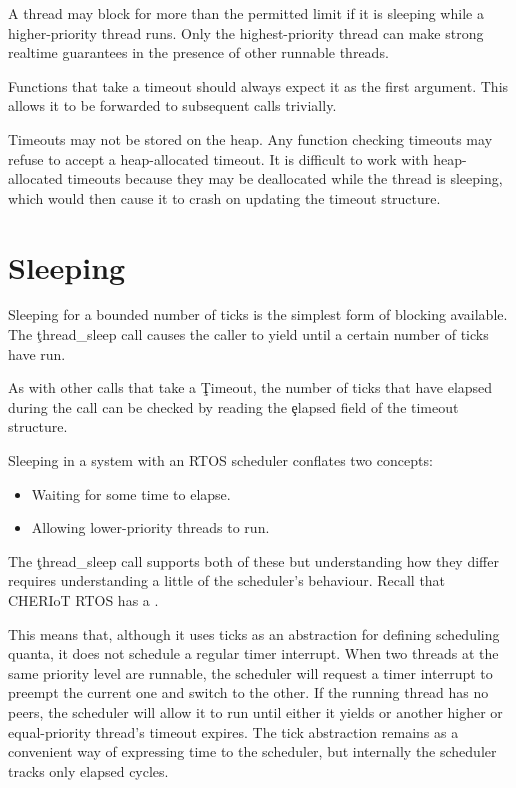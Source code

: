 \begin{note}
A thread may block for more than the permitted limit if it is sleeping while a higher-priority thread runs.
Only the highest-priority thread can make strong realtime guarantees in the presence of other runnable threads.
\end{note}

Functions that take a timeout should always expect it as the first argument.
This allows it to be forwarded to subsequent calls trivially.

\begin{warning}
Timeouts may not be stored on the heap.
Any function checking timeouts may refuse to accept a heap-allocated timeout.
It is difficult to work with heap-allocated timeouts because they may be deallocated while the thread is sleeping, which would then cause it to crash on updating the timeout structure.
\end{warning}

\section{Sleeping}

Sleeping for a bounded number of ticks is the simplest form of blocking available.
The \c{thread_sleep} call causes the caller to yield until a certain number of ticks have run.

As with other calls that take a \c{Timeout}, the number of ticks that have elapsed during the call can be checked by reading the \c{elapsed} field of the timeout structure.

Sleeping in a system with an RTOS scheduler conflates two concepts:

\begin{itemize}
	\item{Waiting for some time to elapse.}
	\item{Allowing lower-priority threads to run.}
\end{itemize}

The \c{thread_sleep} call supports both of these but understanding how they differ requires understanding a little of the scheduler's behaviour.
Recall that CHERIoT RTOS has a .

This means that, although it uses ticks as an abstraction for defining scheduling quanta, it does not schedule a regular timer interrupt.
When two threads at the same priority level are runnable, the scheduler will request a timer interrupt to preempt the current one and switch to the other.
If the running thread has no peers, the scheduler will allow it to run until either it yields or another higher or equal-priority thread's timeout expires.
The tick abstraction remains as a convenient way of expressing time to the scheduler, but internally the scheduler tracks only elapsed cycles.

